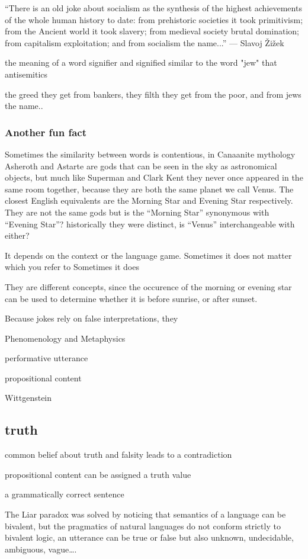 ``There is an old joke about socialism as the synthesis of the highest achievements of the whole human history to date: from prehistoric societies it took primitivism; from the Ancient world it took slavery; from medieval society brutal domination; from capitalism exploitation; and from socialism the name...'' --- Slavoj Žižek

the meaning of a word
signifier and signified
similar to the word "jew" that antisemitics 

the greed they get from bankers, they filth they get from the poor, and from jews the name..

\subsubsection*{Another fun fact}
Sometimes the similarity between words is contentious, in Canaanite mythology Asheroth and Astarte are gods that can be seen in the sky as astronomical objects, but much like Superman and Clark Kent they never once appeared in the same room together, because they are both the same planet we call Venus. The closest English equivalents are the Morning Star and Evening Star respectively. They are not the same gods but is the ``Morning Star'' synonymous with ``Evening Star''? historically they were distinct, is ``Venus'' interchangeable with either?

It depends on the context or the language game.
Sometimes it does not matter which you refer to
Sometimes it does

They are different concepts, since the occurence of the morning or evening star can be used to determine whether it is before sunrise, or after sunset.

Because jokes rely on false interpretations, they 

Phenomenology and Metaphysics

performative utterance

propositional content

Wittgenstein 

\subsection{truth}
common belief about truth and falsity leads to a contradiction

propositional content can be assigned a truth value

a grammatically correct sentence 

The Liar paradox was solved by noticing that semantics of a language can be bivalent, but the pragmatics of natural languages do not conform strictly to bivalent logic, an utterance can be true or false but also unknown, undecidable, ambiguous, vague….


